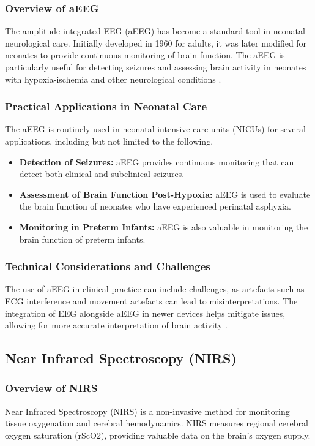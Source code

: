 \documentclass[12pt,journal,compsoc]{IEEEtran}
\begin{document}
\subsubsection{Overview of aEEG}
The amplitude-integrated EEG (aEEG) has become a standard tool in neonatal neurological care. Initially developed in 1960 for adults, it was later modified for neonates to provide continuous monitoring of brain function. The aEEG is particularly useful for detecting seizures and assessing brain activity in neonates with hypoxia-ischemia and other neurological conditions \cite{IEEEhowto:toet}.

\subsubsection{Practical Applications in Neonatal Care}
The aEEG is routinely used in neonatal intensive care units (NICUs) for several applications, including but not limited to the following. 

\begin{itemize}
    \item \textbf{Detection of Seizures:} aEEG provides continuous monitoring that can detect both clinical and subclinical seizures.
    \item \textbf{Assessment of Brain Function Post-Hypoxia:} aEEG is used to evaluate the brain function of neonates who have experienced perinatal asphyxia.
    \item \textbf{Monitoring in Preterm Infants:} aEEG is also valuable in monitoring the brain function of preterm infants.
\end{itemize}

\subsubsection{Technical Considerations and Challenges}
The use of aEEG in clinical practice can include challenges, as artefacts such as ECG interference and movement artefacts can lead to misinterpretations. The integration of EEG alongside aEEG in newer devices helps mitigate issues, allowing for more accurate interpretation of brain activity \cite{IEEEhowto:toet}.

\subsection{Near Infrared Spectroscopy (NIRS)}

\subsubsection{Overview of NIRS}
Near Infrared Spectroscopy (NIRS) is a non-invasive method for monitoring tissue oxygenation and cerebral hemodynamics. NIRS measures regional cerebral oxygen saturation (rScO2), providing valuable data on the brain's oxygen supply. 
\end{document}
